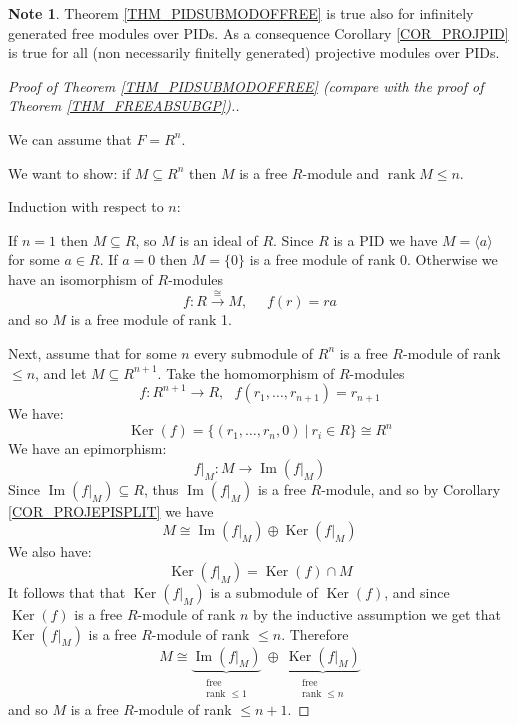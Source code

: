\documentclass[12pt, letterpaper, oneside]{article}
\theoremstyle{plain}
\theoremstyle{definition}
\newtheorem{note}[theorem]{Note}
\newcommand{\lra}{\longrightarrow}
\renewcommand{\Im}{\operatorname{Im}}
\newcommand{\Ker}{\operatorname{Ker}}
\newcommand{\subgp}[1]{\langle#1\rangle}
\newcommand{\rank}{\operatorname{rank}}
\newcommand{\vs}{\vskip 5mm}
\begin{document}
\vs\vs

\begin{note}
Theorem \ref{THM_PIDSUBMODOFFREE} is true also for infinitely generated free modules
over PIDs. As a consequence  Corollary \ref{COR_PROJPID} is true for all (non necessarily 
finitelly generated) projective modules over PIDs.
\end{note}



\vs\vs

\begin{proof}[Proof of Theorem \ref{THM_PIDSUBMODOFFREE} 
(compare with the proof of Theorem \ref{THM_FREEABSUBGP}).] \ 


We can assume that $F= R^{n}$. 

We want to show: if $M\subseteq R^{n}$ then $M$ is a free $R$-module and $\rank M \leq n$. 

\vs

Induction with respect to $n$:


If $n=1$ then $M\subseteq R$, so $M$ is an ideal of $R$. Since $R$ is a PID we have 
$M =\subgp{a}$ for some $a\in R$. If $a=0$ then $M=\{0\}$ is a free module of rank 0. 
Otherwise we have an isomorphism of $R$-modules
$$f\colon R \overset{\cong}{\lra} M, \ \ \ \ \ \ f(r) = ra$$ 
and so $M$ is a free module of rank 1. 


Next,  assume that for some $n$ every submodule of $R^{n}$ is a free $R$-module of 
rank $\leq n$, and let $M\subseteq R^{n+1}$.  Take the homomorphism of $R$-modules
$$f\colon R^{n+1} \to R, \ \ \ f(r_{1}, \dots, r_{n+1}) = r_{n+1}$$
We have:
$$\Ker(f) = \{(r_{1}, \dots, r_{n}, 0) \ | \  r_{i}\in R\}\cong R^{n}$$
We have an epimorphism:
$$f|_{M}\colon M \to \Im(f|_{M})$$
Since $\Im(f|_{M})\subseteq R$, thus $\Im(f|_{M})$ is a free $R$-module, and so by 
Corollary \ref{COR_PROJEPISPLIT} we have 
$$M \cong \Im(f|_{M})\oplus \Ker(f|_{M})$$
We also have:
$$\Ker(f|_{M}) = \Ker(f)\cap M$$ 
It follows that that $\Ker(f|_{M})$ is a submodule of $\Ker(f)$, and since $\Ker(f)$ is 
a free $R$-module of rank $n$ by the inductive assumption we get that 
$\Ker(f|_{M})$ is a free $R$-module of rank $\leq n$.
Therefore 
$$M\cong 
\underbrace{\Im(f|_{M})}_{
\begin{smallmatrix}
  \text{free}\\
  \text{rank $\leq 1$}
\end{smallmatrix}
}
\ \oplus \  
\underbrace{\Ker(f|_{M})}_{
\begin{smallmatrix}
  \text{free}\\
  \text{rank $\leq n$}
\end{smallmatrix}
}
$$
and so $M$ is a free $R$-module of rank $\leq n+1$. 


\end{proof}
\end{document}
